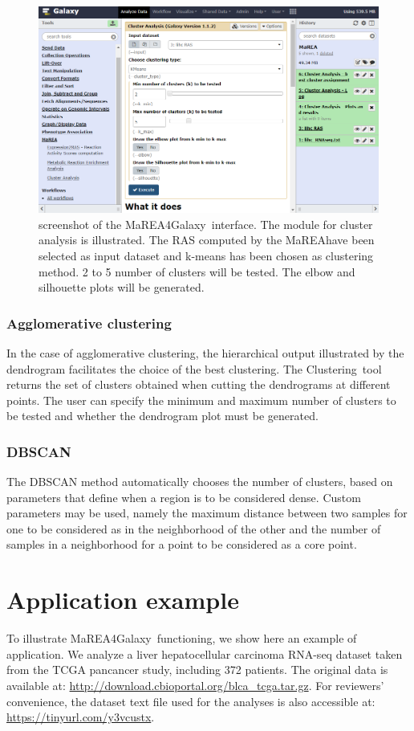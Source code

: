 \documentclass[preprint,12pt,authoryear]{elsarticle}
\newcommand{\mareagalaxy}{\textsf{MaREA4Galaxy}}
\newcommand{\mareaTool}{\textsf{MaREA}}
\newcommand{\clusterTool}{\textsf{Clustering}}
\begin{document}
\begin{figure}[ht]
    \includegraphics[width=1\textwidth]{figs/screenshot2v2q.png}
	\caption{screenshot of the \mareagalaxy\ interface. The module for cluster analysis is illustrated. The RAS computed  by the \mareaTool have been selected as input dataset and k-means has been chosen as clustering method. 2 to 5 number of clusters will be tested. The elbow and silhouette plots will be generated.}
	\label{fig:screenshot2}
\end{figure}

\subsubsection{Agglomerative clustering}
In the case of agglomerative clustering, the hierarchical output illustrated by the dendrogram facilitates the choice of the best clustering. The \clusterTool\ tool returns the set of clusters obtained when cutting the dendrograms at different points.
The user can specify the minimum and maximum number of clusters to be tested and whether the dendrogram plot must be generated.


\subsubsection{DBSCAN}
The DBSCAN method automatically chooses the number of clusters, based on parameters that define when a region is to be considered dense. Custom parameters may be used, namely the maximum distance between two samples for one to be considered as in the neighborhood of the other and the number of samples in a neighborhood for a point to be considered as a core point.


\section{Application example} 
To illustrate \mareagalaxy\ functioning, we show here an example of application.
We analyze a liver hepatocellular carcinoma RNA-seq dataset taken from the TCGA pancancer study, including 372 patients.
The original data is available at: \url{http://download.cbioportal.org/blca\_tcga.tar.gz}. 
For reviewers' convenience, the dataset text file used for the analyses is also accessible at: \url{https://tinyurl.com/y3vcustx}.
\end{document}
